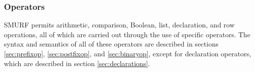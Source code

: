 \subsubsection{Operators}
SMURF permits arithmetic, comparison, Boolean, list, declaration, and row operations, all of which
are carried out through the use of specific operators. The syntax and semantics of all of these
operators are described in sections \ref{sec:prefixop}, \ref{sec:postfixop}, and \ref{sec:binaryop},
except for declaration operators, which are described in section \ref{sec:declarations}.


%
%
%
%
